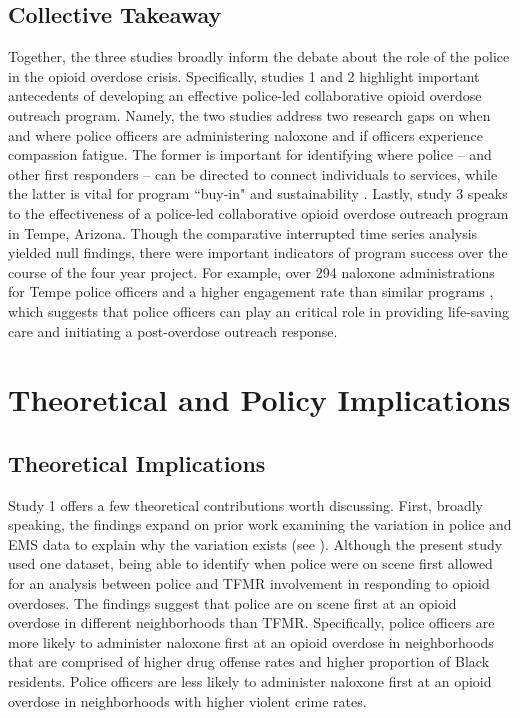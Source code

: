 \subsection{Collective Takeaway}
Together, the three studies broadly inform the debate about the role of the police in the opioid overdose crisis. Specifically, studies 1 and 2 highlight important antecedents of developing an effective police-led collaborative opioid overdose outreach program. Namely, the two studies address two research gaps on when and where police officers are administering naloxone and if officers experience compassion fatigue. The former is important for identifying where police -- and other first responders -- can be directed to connect individuals to services, while the latter is vital for program ``buy-in" and sustainability \parencite{winstanley_bell_2020}. Lastly, study 3 speaks to the effectiveness of a police-led collaborative opioid overdose outreach program in Tempe, Arizona. Though the comparative interrupted time series analysis yielded null findings, there were important indicators of program success over the course of the four year project. For example, over 294 naloxone administrations for Tempe police officers and a higher engagement rate than similar programs \parencite{watts_tempe_2023}, which suggests that police officers can play an critical role in providing life-saving care and initiating a post-overdose outreach response.

\section{Theoretical and Policy Implications}
\subsection{Theoretical Implications}
Study 1 offers a few theoretical contributions worth discussing. First, broadly speaking, the findings expand on prior work examining the variation in police and EMS data to explain why the variation exists (see \cite{hibdon_use_2024}). Although the present study used one dataset, being able to identify when police were on scene first allowed for an analysis between police and TFMR involvement in responding to opioid overdoses. The findings suggest that police are on scene first at an opioid overdose in different neighborhoods than TFMR. Specifically, police officers are more likely to administer naloxone first at an opioid overdose in neighborhoods that are comprised of higher drug offense rates and higher proportion of Black residents. Police officers are less likely to administer naloxone first at an opioid overdose in neighborhoods with higher violent crime rates.

